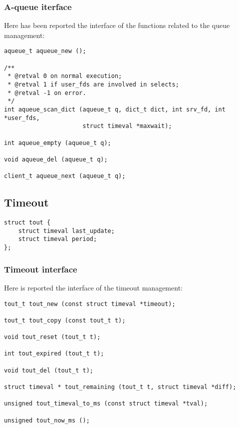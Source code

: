 \subsubsection{A-queue iterface}
Here has been reported the interface of the functions related to the queue management:
\begin{lstlisting}
aqueue_t aqueue_new ();

/**                                                                                                        
 * @retval 0 on normal execution;                                                                          
 * @retval 1 if user_fds are involved in selects;                                                          
 * @retval -1 on error.                                                                                    
 */
int aqueue_scan_dict (aqueue_t q, dict_t dict, int srv_fd, int *user_fds,
                      struct timeval *maxwait);

int aqueue_empty (aqueue_t q);

void aqueue_del (aqueue_t q);

client_t aqueue_next (aqueue_t q);
\end{lstlisting}

\subsection{Timeout}

\begin{lstlisting}
struct tout {
    struct timeval last_update;
    struct timeval period;
};
\end{lstlisting}

\subsubsection{Timeout interface}
Here is reported the interface of the timeout management:
\begin{lstlisting}
tout_t tout_new (const struct timeval *timeout);

tout_t tout_copy (const tout_t t);

void tout_reset (tout_t t);

int tout_expired (tout_t t);

void tout_del (tout_t t);

struct timeval * tout_remaining (tout_t t, struct timeval *diff);

unsigned tout_timeval_to_ms (const struct timeval *tval);

unsigned tout_now_ms ();
\end{lstlisting}
